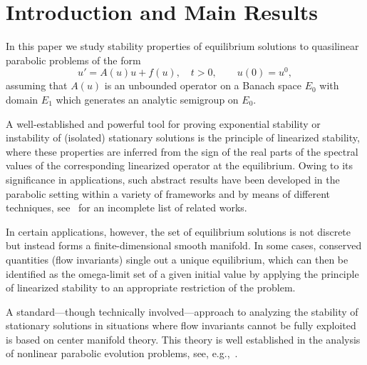 \documentclass[reqno,11pt]{amsart}
\numberwithin{equation}{section}
\theoremstyle{remark}
\begin{document}
\section{Introduction and Main Results}


In this paper we study stability properties of equilibrium solutions to quasilinear parabolic problems of the form
	\begin{equation}\label{CP}
		u'=A(u)u+f(u),\quad t>0,\qquad u(0)=u^0,
	\end{equation} 
assuming that $A(u)$ is an unbounded operator on a Banach space $E_0$ with domain $E_1$ which generates an analytic semigroup  on $E_0$.

 A well-established and powerful tool for proving 
exponential stability or instability of (isolated) stationary solutions is the principle of linearized stability, where
these properties are inferred from the sign of the real parts of the spectral values of the corresponding linearized operator  at the equilibrium.
Owing to its significance in applications, such abstract results have been developed in the parabolic setting within a variety of frameworks and by means of different techniques, see~\cite{DaPL88,D89,G88,Lu85,L95,PF81,P02,PSW18,MW20, MSW25} for an incomplete list of related works.


In certain applications, however, the set of equilibrium solutions is not discrete but instead forms a finite-dimensional smooth manifold. In some cases, conserved quantities (flow invariants) single out a unique equilibrium, which can then be identified as the omega-limit set of a given initial value by applying the principle of linearized stability to an appropriate restriction of the problem.

A standard—though technically involved—approach to analyzing the stability of stationary solutions in situations where flow invariants cannot be fully exploited is based on center manifold theory.
This theory is well established in the analysis of nonlinear parabolic evolution problems, see, e.g.,~\cite{Carr82,L95, HD81, DaPL88, BHL00, LPS08, LPS06, MA91, GS95, C09}.
\end{document}
